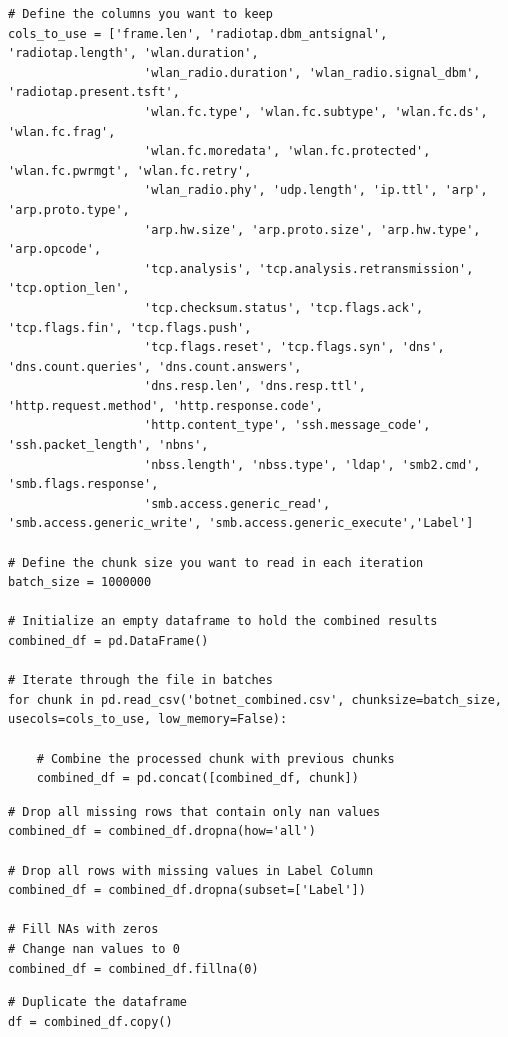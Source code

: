\begin{appendices}
\begin{lstlisting}
# Define the columns you want to keep
cols_to_use = ['frame.len', 'radiotap.dbm_antsignal', 'radiotap.length', 'wlan.duration',
                   'wlan_radio.duration', 'wlan_radio.signal_dbm', 'radiotap.present.tsft',
                   'wlan.fc.type', 'wlan.fc.subtype', 'wlan.fc.ds', 'wlan.fc.frag',
                   'wlan.fc.moredata', 'wlan.fc.protected', 'wlan.fc.pwrmgt', 'wlan.fc.retry',
                   'wlan_radio.phy', 'udp.length', 'ip.ttl', 'arp', 'arp.proto.type',
                   'arp.hw.size', 'arp.proto.size', 'arp.hw.type', 'arp.opcode',
                   'tcp.analysis', 'tcp.analysis.retransmission', 'tcp.option_len',
                   'tcp.checksum.status', 'tcp.flags.ack', 'tcp.flags.fin', 'tcp.flags.push',
                   'tcp.flags.reset', 'tcp.flags.syn', 'dns', 'dns.count.queries', 'dns.count.answers',
                   'dns.resp.len', 'dns.resp.ttl', 'http.request.method', 'http.response.code',
                   'http.content_type', 'ssh.message_code', 'ssh.packet_length', 'nbns',
                   'nbss.length', 'nbss.type', 'ldap', 'smb2.cmd', 'smb.flags.response',
                   'smb.access.generic_read', 'smb.access.generic_write', 'smb.access.generic_execute','Label']

# Define the chunk size you want to read in each iteration
batch_size = 1000000

# Initialize an empty dataframe to hold the combined results
combined_df = pd.DataFrame()

# Iterate through the file in batches
for chunk in pd.read_csv('botnet_combined.csv', chunksize=batch_size, usecols=cols_to_use, low_memory=False):
    
    # Combine the processed chunk with previous chunks
    combined_df = pd.concat([combined_df, chunk])
\end{lstlisting}

\newpage
\begin{lstlisting}
# Drop all missing rows that contain only nan values
combined_df = combined_df.dropna(how='all')

# Drop all rows with missing values in Label Column
combined_df = combined_df.dropna(subset=['Label'])

# Fill NAs with zeros
# Change nan values to 0
combined_df = combined_df.fillna(0)
\end{lstlisting}

\begin{lstlisting}
# Duplicate the dataframe
df = combined_df.copy()


\end{lstlisting}
\end{appendices}
